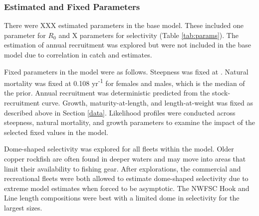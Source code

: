 \documentclass[11pt,
  english,
  a4paper,
]{article}
\begin{document}
\leavevmode\tagmcend\tagstructend\par


\hypertarget{estimated-and-fixed-parameters}{%
\subsubsection{Estimated and Fixed Parameters}\label{estimated-and-fixed-parameters}}

\leavevmode\tagmcend\tagstructend


There were XXX estimated parameters in the base model. These included one parameter for {\(R_0\)\leavevmode\tagmcend\tagstructend} and X parameters for selectivity (Table \ref{tab:params}). The estimation of annual recruitment was explored but were not included in the base model due to correlation in catch and estimates.

\leavevmode\tagmcend\tagstructend\par


Fixed parameters in the model were as follows. Steepness was fixed at . Natural mortality was fixed at 0.108 yr\textsuperscript{-1} for females and males, which is the median of the prior. Annual recruitment was deterministic predicted from the stock-recruitment curve. Growth, maturity-at-length, and length-at-weight was fixed as described above in Section \ref{data}. Likelihood profiles were conducted across steepness, natural mortality, and growth parameters to examine the impact of the selected fixed values in the model.

\leavevmode\tagmcend\tagstructend\par


Dome-shaped selectivity was explored for all fleets within the model. Older copper rockfish are often found in deeper waters and may move into areas that limit their availability to fishing gear. After explorations, the commercial and recreational fleets were both allowed to estimate dome-shaped selectivity due to extreme model estimates when forced to be asymptotic. The NWFSC Hook and Line length compositions were best with a limited dome in selectivity for the largest sizes.
\end{document}
